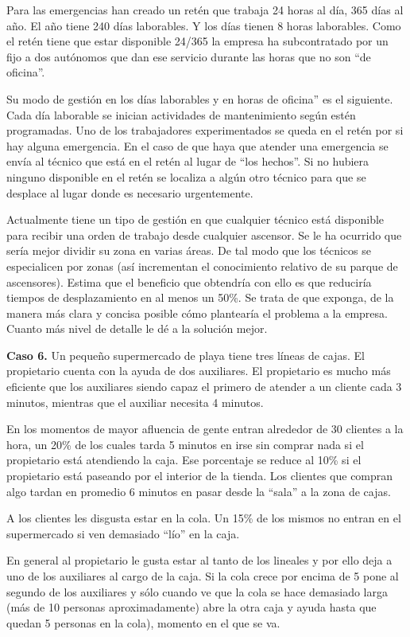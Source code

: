 \documentclass[
]{book}
\theoremstyle{definition}
\theoremstyle{definition}
\theoremstyle{definition}
\theoremstyle{definition}
\theoremstyle{remark}
\begin{document}
Para las emergencias han creado un retén que trabaja 24 horas al día, 365 días al año. El año tiene 240 días laborables. Y los días tienen 8 horas laborables. Como el retén tiene que estar disponible 24/365 la empresa ha subcontratado por un fijo a dos autónomos que dan ese servicio durante las horas que no son ``de oficina''.

Su modo de gestión en los días laborables y en horas de oficina'' es el siguiente. Cada día laborable se inician actividades de mantenimiento según estén programadas. Uno de los trabajadores experimentados se queda en el retén por si hay alguna emergencia. En el caso de que haya que atender una emergencia se
envía al técnico que está en el retén al lugar de ``los hechos''. Si no hubiera ninguno disponible en el retén se localiza a algún otro técnico para que se desplace al lugar donde es necesario urgentemente.

Actualmente tiene un tipo de gestión en que cualquier técnico está disponible para recibir una orden de trabajo desde cualquier ascensor. Se le ha ocurrido que sería mejor dividir su zona en varias áreas. De tal modo que los técnicos se especialicen por zonas (así incrementan el conocimiento relativo de su parque de ascensores). Estima que el beneficio que obtendría con ello es que reduciría tiempos de desplazamiento en al menos un 50\%. Se trata de que exponga, de la manera más clara y concisa posible cómo plantearía el problema a la empresa. Cuanto más nivel de detalle le dé a la solución mejor.

\textbf{Caso 6.} Un pequeño supermercado de playa tiene tres líneas de cajas. El propietario cuenta con la ayuda de dos auxiliares. El propietario es mucho más eficiente que los auxiliares siendo capaz el primero
de atender a un cliente cada 3 minutos, mientras que el auxiliar necesita 4 minutos.

En los momentos de mayor afluencia de gente entran alrededor de 30 clientes a la hora, un 20\% de los cuales tarda 5 minutos en irse sin comprar nada si el propietario está atendiendo la caja. Ese porcentaje se reduce al 10\% si el propietario está paseando por el interior de la tienda. Los clientes que compran algo tardan en promedio 6 minutos en pasar desde la ``sala'' a la zona de cajas.

A los clientes les disgusta estar en la cola. Un 15\% de los mismos no entran en el supermercado si ven demasiado ``lío'' en la caja.

En general al propietario le gusta estar al tanto de los lineales y por ello deja a uno de los auxiliares al cargo de la caja. Si la cola crece por encima de 5 pone al segundo de los auxiliares y sólo cuando ve que la cola se hace demasiado larga (más de 10 personas aproximadamente) abre la otra caja y ayuda hasta que quedan 5 personas en la cola), momento en el que se va.
\end{document}
